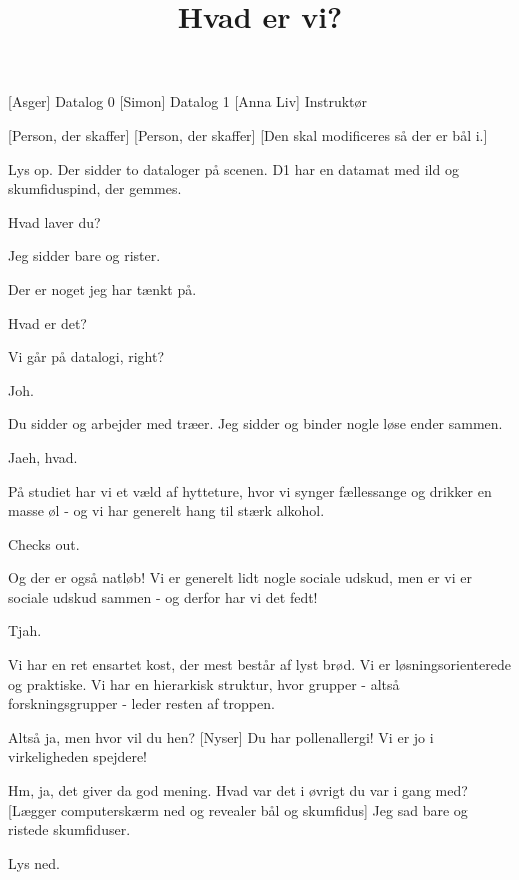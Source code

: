 \documentclass{article}
\title{Hvad er vi?}
\begin{document}
\maketitle

\begin{roles}
[Asger] Datalog 0
[Simon] Datalog 1
[Anna Liv] Instruktør
\end{roles}

\begin{props}
[Person, der skaffer]
[Person, der skaffer]
[Den skal modificeres så der er bål i.]

\end{props}

\begin{sketch}

\scene Lys op. Der sidder to dataloger på scenen. D1 har en datamat med ild og skumfiduspind, der gemmes.


 Hvad laver du?

 Jeg sidder bare og rister.

 Der er noget jeg har tænkt på.

 Hvad er det?

 Vi går på datalogi, right?

 Joh.

 Du sidder og arbejder med træer. Jeg sidder og binder nogle løse ender sammen.

 Jaeh, hvad.

 På studiet har vi et væld af hytteture, hvor vi synger fællessange og drikker en masse øl - og vi har generelt hang til stærk alkohol.

 Checks out.

 Og der er også natløb! Vi er generelt lidt nogle sociale udskud, men er vi er sociale udskud sammen - og derfor har vi det fedt!

 Tjah.

 Vi har en ret ensartet kost, der mest består af lyst brød. Vi er løsningsorienterede og praktiske. Vi har en hierarkisk struktur, hvor grupper - altså forskningsgrupper - leder resten af troppen.

 Altså ja, men hvor vil du hen?
[Nyser]
 Du har pollenallergi! Vi er jo i virkeligheden spejdere!


 Hm, ja, det giver da god mening. %
 Hvad var det i øvrigt du var i gang med?
[Lægger computerskærm ned og revealer bål og skumfidus] Jeg sad bare og ristede skumfiduser.




\scene Lys ned.


\end{sketch}
\end{document}
